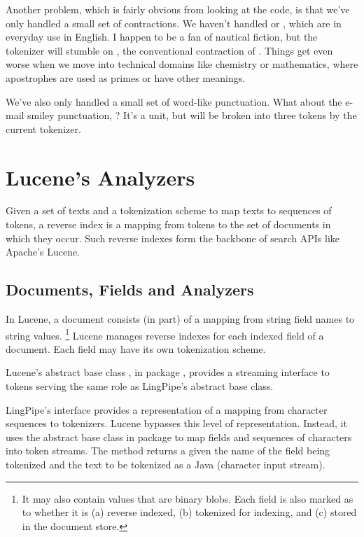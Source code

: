 Another problem, which is fairly obvious from looking at the code, is
that we've only handled a small set of contractions.  We haven't
handled  or , which are in
everyday use in English.  I happen to be a fan of nautical fiction,
but the tokenizer will stumble on , the
conventional contraction of .  Things get
even worse when we move into technical domains like chemistry or
mathematics, where apostrophes are used as primes or have other
meanings.

We've also only handled a small set of word-like punctuation.  What
about the e-mail smiley punctuation, \stringmention{:-)}?  It's a unit,
but will be broken into three tokens by the current tokenizer.


\section{Lucene's Analyzers}

Given a set of texts and a tokenization scheme to map texts to
sequences of tokens, a reverse index is a mapping from tokens to the
set of documents in which they occur.  Such reverse indexes form
the backbone of search APIs like Apache's Lucene.

\subsection{Documents, Fields and Analyzers}

In Lucene, a document consists (in part) of a mapping from string
field names to string values.%
%
\footnote{It may also contain values that are binary blobs.  Each
  field is also marked as to whether it is (a) reverse indexed, (b)
  tokenized for indexing, and (c) stored in the document store.}
%
Lucene manages reverse indexes for each indexed field of a document.
Each field may have its own tokenization scheme.  

Lucene's abstract base class , in package
, provides a streaming interface to
tokens serving the same role as LingPipe's  abstract
base class.

LingPipe's  interface provides a representation
of a mapping from character sequences to tokenizers.  Lucene bypasses
this level of representation.  Instead, it uses the 
abstract base class in package  to
map fields and sequences of characters into token streams.  The method
 returns a  given
the name of the field being tokenized and the text to be tokenized as
a Java  (character input stream).


